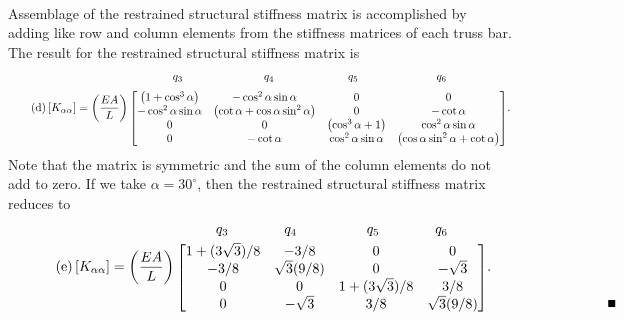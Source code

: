 \documentclass{AeroStructure-ERJohnson}
\begin{document}
\begin{example*}
\begin{gather}
\end{gather}
Assemblage of the restrained structural stiffness matrix is accomplished by adding like row and column elements from the stiffness matrices of each truss bar. The result for the restrained structural stiffness matrix is\pagebreak
\begin{align}\label{eq16.4d}\tag{d}
\left[K_{\alpha \alpha}\right]=\left(\frac{E A}{L}\right)\begin{array}{@{}c@{}}{\begin{array}{@{\hspace*{-6pt}}c@{\qquad\qquad\qquad}c@{\qquad\qquad\qquad}c@{\qquad\qquad\qquad\;\;}c@{}}
\hspace*{-0.8pc}q_{3}\hspace*{6pt} &\hspace*{6pt} q_{4}&\hspace*{9pt} \!\!q_{5}\hspace*{-6pt} & \phantom{00}q_{6} \end{array}}\\[6pt]\left[\begin{array}{@{}cccc@{}}\left(1+\cos ^{3} \alpha\right) & -\cos ^{2} \alpha \sin \alpha & 0 & 0 \\-\cos ^{2} \alpha \sin \alpha & \left(\cot \alpha+\cos \alpha \sin ^{2} \alpha\right) & 0 & -\cot \alpha \\0 & 0 & \left(\cos ^{3} \alpha+1\right) & \cos ^{2} \alpha \sin \alpha \\0 & -\cot \alpha & \cos ^{2} \alpha \sin \alpha & \left(\cos \alpha \sin ^{2} \alpha+\cot \alpha\right)\end{array}\right]\end{array}.
\end{align}
Note that the matrix is symmetric and the sum of the column elements do not add to zero. If we take $\alpha=30^{\circ}$, then the restrained structural stiffness matrix reduces to
\begin{align}\label{eq16.4e}\tag{e}
\left[K_{\alpha \alpha}\right]=\left(\frac{E A}{L}\right)\begin{array}{@{}c@{}}\begin{array}{@{}c@{\qquad\qquad}c@{\qquad\qquad\quad}c@{\qquad\qquad}c@{}}q_{3} & q_{4} & q_{5} & q_{6} \end{array}\\[3pt]\left[\begin{array}{@{}cccc@{}}1+(3 \sqrt{3}) / 8 & -3 / 8 & 0 & 0 \\-3 / 8 & \sqrt{3}(9 / 8) & 0 & -\sqrt{3} \\0 & 0 & 1+(3 \sqrt{3}) / 8 & 3 / 8 \\0 & -\sqrt{3} & 3 / 8 & \sqrt{3}(9 / 8)\end{array}\right]\end{array}. \\[-1.4pc] \nonumber {\hfill\qed\hspace*{-7.4pc}}
\end{align}
\end{example*}
\end{document}
